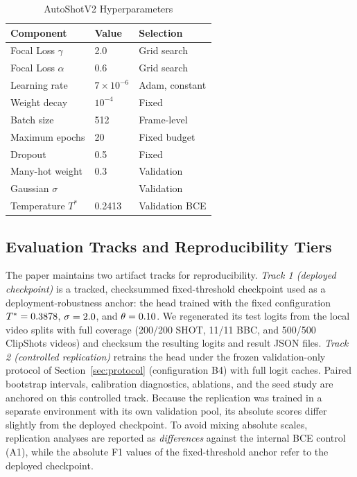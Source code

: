 \begin{table}[!t]
\caption{AutoShotV2 Hyperparameters}
\label{tab:hyperparams}
\centering
\small
\renewcommand{\arraystretch}{1.08}
\begin{tabular}{L{1.25in}C{0.7in}L{0.85in}}
\toprule
\textbf{Component} & \textbf{Value} & \textbf{Selection} \\
\midrule
Focal Loss $\gamma$ & 2.0 & Grid search \\
Focal Loss $\alpha$ & 0.6 & Grid search \\
Learning rate & $7\times10^{-6}$ & Adam, constant \\
Weight decay & $10^{-4}$ & Fixed \\
Batch size & 512 & Frame-level \\
Maximum epochs & 20 & Fixed budget \\
Dropout & 0.5 & Fixed \\
Many-hot weight & 0.3 & Validation \\
Gaussian $\sigma$ & \PaperGaussianSigma{} & Validation \\
Temperature $T^{*}$ & 0.2413 & Validation BCE \\
\bottomrule
\end{tabular}
\vspace{0.5ex}
\end{table}

\subsection{Evaluation Tracks and Reproducibility Tiers}
\label{sec:tracks}

The paper maintains two artifact tracks for reproducibility.
\emph{Track 1 (deployed checkpoint)} is a tracked, checksummed fixed-threshold
checkpoint used as a deployment-robustness anchor: the head trained with the
fixed configuration
$T^{*}=0.3878$, $\sigma=2.0$, and
$\theta=0.10$. We regenerated its test logits from the local
video splits with full coverage (200/200 SHOT, 11/11 BBC, and 500/500
ClipShots videos) and checksum the resulting logits and result JSON files.
\emph{Track 2 (controlled replication)} retrains the head under the frozen
validation-only protocol of Section~\ref{sec:protocol} (configuration B4) with
full logit caches. Paired bootstrap intervals, calibration diagnostics,
ablations, and the seed study are anchored on this controlled track. Because
the replication was trained in a separate environment with its own validation
pool, its absolute scores differ slightly from the deployed checkpoint. To
avoid mixing absolute scales, replication analyses are reported as
\emph{differences} against the internal BCE control (A1), while the absolute F1
values of the fixed-threshold anchor refer to the deployed checkpoint.

